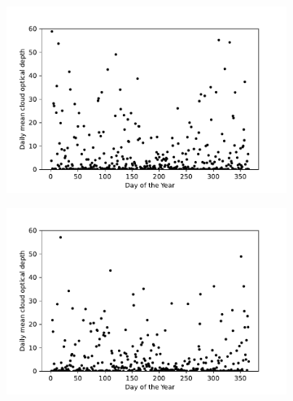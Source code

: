 \documentclass{optica-article}
\begin{document}
\begin{figure}
	\centering
	
	\begin{subfigure}[b]{0.45\textwidth}
		\includegraphics[width=\textwidth]{COD_vs_DOY_2014}
		\caption{}
		\label{fig:codvsdoy2014}
	\end{subfigure}
	\hfill
	\begin{subfigure}[b]{0.45\textwidth}
		\includegraphics[width=\textwidth]{COD_vs_DOY_2015}
		\caption{}
		\label{fig:codvsdoy2015}
	\end{subfigure}
	
	\vspace{0.5cm}
	

\end{figure}
\end{document}
